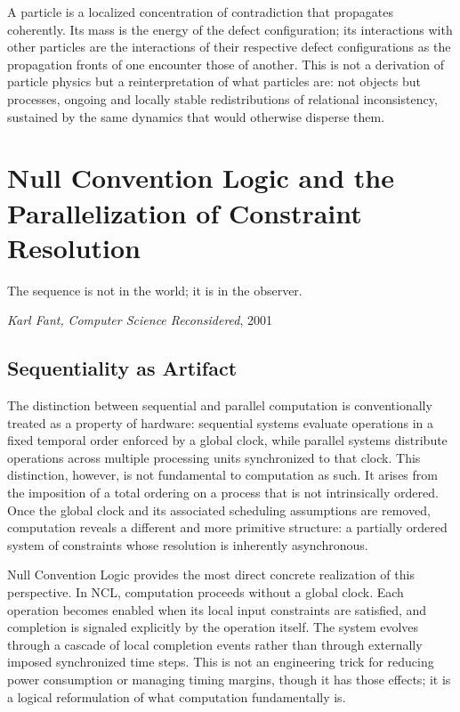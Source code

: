 \documentclass[12pt,a4paper,openany]{book}
\theoremstyle{plain}
\theoremstyle{definition}
\theoremstyle{remark}
\begin{document}
A particle is a localized concentration of contradiction that propagates coherently. Its mass is the energy of the defect configuration; its interactions with other particles are the interactions of their respective defect configurations as the propagation fronts of one encounter those of another. This is not a derivation of particle physics but a reinterpretation of what particles are: not objects but processes, ongoing and locally stable redistributions of relational inconsistency, sustained by the same dynamics that would otherwise disperse them.

\chapter{Null Convention Logic and the Parallelization of Constraint Resolution}

\epigraph{%
  The sequence is not in the world; it is in the observer.
}{%
  \textit{Karl Fant,} \textit{Computer Science Reconsidered}, 2001
}

\section{Sequentiality as Artifact}

The distinction between sequential and parallel computation is conventionally treated as a property of hardware: sequential systems evaluate operations in a fixed temporal order enforced by a global clock, while parallel systems distribute operations across multiple processing units synchronized to that clock. This distinction, however, is not fundamental to computation as such. It arises from the imposition of a total ordering on a process that is not intrinsically ordered. Once the global clock and its associated scheduling assumptions are removed, computation reveals a different and more primitive structure: a partially ordered system of constraints whose resolution is inherently asynchronous.

Null Convention Logic \cite{FantCSR2001,FantLDD2005} provides the most direct concrete realization of this perspective. In NCL, computation proceeds without a global clock. Each operation becomes enabled when its local input constraints are satisfied, and completion is signaled explicitly by the operation itself. The system evolves through a cascade of local completion events rather than through externally imposed synchronized time steps. This is not an engineering trick for reducing power consumption or managing timing margins, though it has those effects; it is a logical reformulation of what computation fundamentally is.
\end{document}
